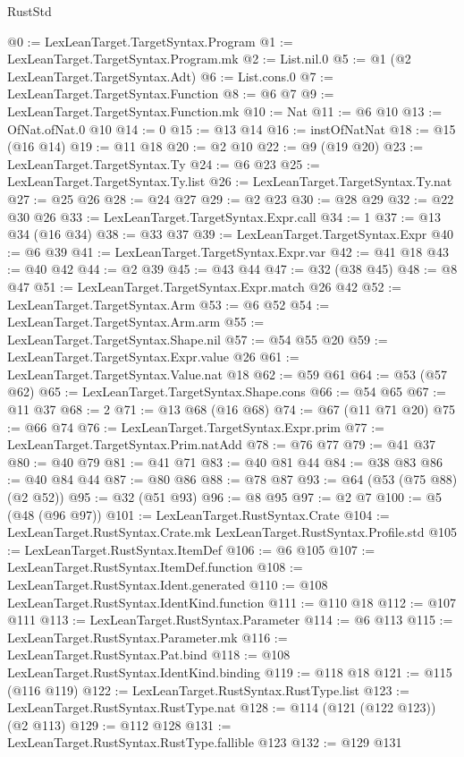 \begin{lexlean}{RustStd}
\begin{coremodule}
@0 := LexLeanTarget.TargetSyntax.Program
@1 := LexLeanTarget.TargetSyntax.Program.mk
@2 := List.nil.{0}
@5 := @1 (@2 LexLeanTarget.TargetSyntax.Adt)
@6 := List.cons.{0}
@7 := LexLeanTarget.TargetSyntax.Function
@8 := @6 @7
@9 := LexLeanTarget.TargetSyntax.Function.mk
@10 := Nat
@11 := @6 @10
@13 := OfNat.ofNat.{0} @10
@14 := 0
@15 := @13 @14
@16 := instOfNatNat
@18 := @15 (@16 @14)
@19 := @11 @18
@20 := @2 @10
@22 := @9 (@19 @20)
@23 := LexLeanTarget.TargetSyntax.Ty
@24 := @6 @23
@25 := LexLeanTarget.TargetSyntax.Ty.list
@26 := LexLeanTarget.TargetSyntax.Ty.nat
@27 := @25 @26
@28 := @24 @27
@29 := @2 @23
@30 := @28 @29
@32 := @22 @30 @26
@33 := LexLeanTarget.TargetSyntax.Expr.call
@34 := 1
@37 := @13 @34 (@16 @34)
@38 := @33 @37
@39 := LexLeanTarget.TargetSyntax.Expr
@40 := @6 @39
@41 := LexLeanTarget.TargetSyntax.Expr.var
@42 := @41 @18
@43 := @40 @42
@44 := @2 @39
@45 := @43 @44
@47 := @32 (@38 @45)
@48 := @8 @47
@51 := LexLeanTarget.TargetSyntax.Expr.match @26 @42
@52 := LexLeanTarget.TargetSyntax.Arm
@53 := @6 @52
@54 := LexLeanTarget.TargetSyntax.Arm.arm
@55 := LexLeanTarget.TargetSyntax.Shape.nil
@57 := @54 @55 @20
@59 := LexLeanTarget.TargetSyntax.Expr.value @26
@61 := LexLeanTarget.TargetSyntax.Value.nat @18
@62 := @59 @61
@64 := @53 (@57 @62)
@65 := LexLeanTarget.TargetSyntax.Shape.cons
@66 := @54 @65
@67 := @11 @37
@68 := 2
@71 := @13 @68 (@16 @68)
@74 := @67 (@11 @71 @20)
@75 := @66 @74
@76 := LexLeanTarget.TargetSyntax.Expr.prim
@77 := LexLeanTarget.TargetSyntax.Prim.natAdd
@78 := @76 @77
@79 := @41 @37
@80 := @40 @79
@81 := @41 @71
@83 := @40 @81 @44
@84 := @38 @83
@86 := @40 @84 @44
@87 := @80 @86
@88 := @78 @87
@93 := @64 (@53 (@75 @88) (@2 @52))
@95 := @32 (@51 @93)
@96 := @8 @95
@97 := @2 @7
@100 := @5 (@48 (@96 @97))
@101 := LexLeanTarget.RustSyntax.Crate
@104 := LexLeanTarget.RustSyntax.Crate.mk LexLeanTarget.RustSyntax.Profile.std
@105 := LexLeanTarget.RustSyntax.ItemDef
@106 := @6 @105
@107 := LexLeanTarget.RustSyntax.ItemDef.function
@108 := LexLeanTarget.RustSyntax.Ident.generated
@110 := @108 LexLeanTarget.RustSyntax.IdentKind.function
@111 := @110 @18
@112 := @107 @111
@113 := LexLeanTarget.RustSyntax.Parameter
@114 := @6 @113
@115 := LexLeanTarget.RustSyntax.Parameter.mk
@116 := LexLeanTarget.RustSyntax.Pat.bind
@118 := @108 LexLeanTarget.RustSyntax.IdentKind.binding
@119 := @118 @18
@121 := @115 (@116 @119)
@122 := LexLeanTarget.RustSyntax.RustType.list
@123 := LexLeanTarget.RustSyntax.RustType.nat
@128 := @114 (@121 (@122 @123)) (@2 @113)
@129 := @112 @128
@131 := LexLeanTarget.RustSyntax.RustType.fallible @123
@132 := @129 @131

\end{coremodule}
\end{lexlean}
